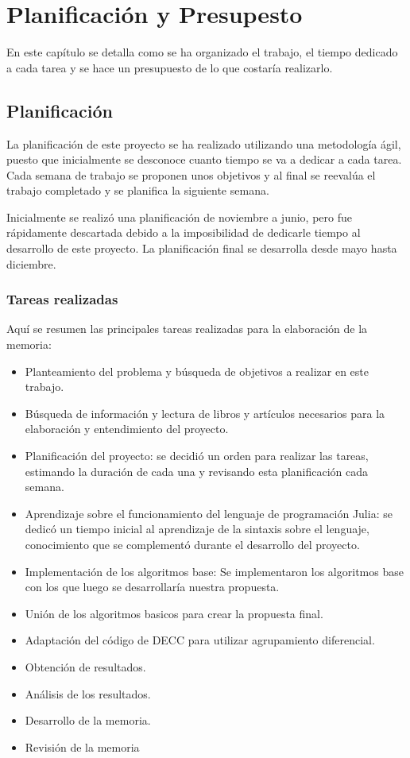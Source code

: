 %

\chapter{Planificación y Presupesto}

En este capítulo se detalla como se ha organizado el trabajo, el tiempo dedicado a cada tarea y se hace un presupuesto de lo que costaría realizarlo.

\section{Planificación}
La planificación de este proyecto se ha realizado utilizando una metodología ágil, puesto que inicialmente se desconoce cuanto tiempo se va a dedicar a cada tarea. Cada semana de trabajo se proponen unos objetivos y al final se reevalúa el trabajo completado y se planifica la siguiente semana.

Inicialmente se realizó una planificación de noviembre a junio, pero fue rápidamente descartada debido a la imposibilidad de dedicarle tiempo al desarrollo de este proyecto. La planificación final se desarrolla desde mayo hasta diciembre.

\subsection{Tareas realizadas}

Aquí se resumen las principales tareas realizadas para la elaboración de la memoria:

\begin{itemize}
\item Planteamiento del problema y búsqueda de objetivos a realizar en este trabajo.
\item Búsqueda de información y lectura de libros y artículos necesarios para la elaboración y entendimiento del proyecto. 
\item Planificación del proyecto: se decidió un orden para realizar las tareas, estimando la duración de cada una y revisando esta planificación cada semana.
\item Aprendizaje sobre el funcionamiento del lenguaje de programación Julia: se dedicó un tiempo inicial al aprendizaje de la sintaxis sobre el lenguaje, conocimiento que se complementó durante el desarrollo del proyecto.
\item Implementación de los algoritmos base: Se implementaron los algoritmos base con los que luego se desarrollaría nuestra propuesta. 
\item Unión de los algoritmos basicos para crear la propuesta final.
\item Adaptación del código de DECC para utilizar agrupamiento diferencial.
\item Obtención de resultados.
\item Análisis de los resultados. 
\item Desarrollo de la memoria.
\item Revisión de la memoria
\end{itemize}

